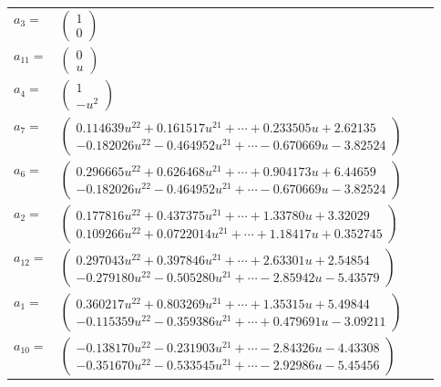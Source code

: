\documentclass[1p]{elsarticle_modified}
\theoremstyle{definition}
\begin{document}
\begin{tabular}{m{7pt} m{180pt} m{7pt} m{180pt} }
\flushright $a_{3}=$&$\begin{pmatrix}1\\0\end{pmatrix}$ \\
\flushright $a_{11}=$&$\begin{pmatrix}0\\u\end{pmatrix}$ \\
\flushright $a_{4}=$&$\begin{pmatrix}1\\- u^2\end{pmatrix}$ \\
\flushright $a_{7}=$&$\begin{pmatrix}0.114639 u^{22}+0.161517 u^{21}+\cdots+0.233505 u+2.62135\\-0.182026 u^{22}-0.464952 u^{21}+\cdots-0.670669 u-3.82524\end{pmatrix}$ \\
\flushright $a_{6}=$&$\begin{pmatrix}0.296665 u^{22}+0.626468 u^{21}+\cdots+0.904173 u+6.44659\\-0.182026 u^{22}-0.464952 u^{21}+\cdots-0.670669 u-3.82524\end{pmatrix}$ \\
\flushright $a_{2}=$&$\begin{pmatrix}0.177816 u^{22}+0.437375 u^{21}+\cdots+1.33780 u+3.32029\\0.109266 u^{22}+0.0722014 u^{21}+\cdots+1.18417 u+0.352745\end{pmatrix}$ \\
\flushright $a_{12}=$&$\begin{pmatrix}0.297043 u^{22}+0.397846 u^{21}+\cdots+2.63301 u+2.54854\\-0.279180 u^{22}-0.505280 u^{21}+\cdots-2.85942 u-5.43579\end{pmatrix}$ \\
\flushright $a_{1}=$&$\begin{pmatrix}0.360217 u^{22}+0.803269 u^{21}+\cdots+1.35315 u+5.49844\\-0.115359 u^{22}-0.359386 u^{21}+\cdots+0.479691 u-3.09211\end{pmatrix}$ \\
\flushright $a_{10}=$&$\begin{pmatrix}-0.138170 u^{22}-0.231903 u^{21}+\cdots-2.84326 u-4.43308\\-0.351670 u^{22}-0.533545 u^{21}+\cdots-2.92986 u-5.45456\end{pmatrix}$ \\

\end{tabular}
\end{document}
